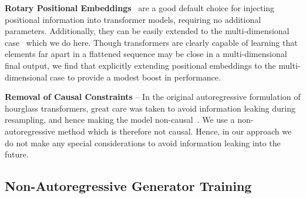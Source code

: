 
\textbf{Rotary Positional Embeddings}~\cite{su2021roformer} are a good default
choice for injecting positional information into transformer models, requiring
no additional parameters. Additionally, they can be easily extended to the
multi-dimensional case~\cite{rope-eleutherai} which we do here. Though
transformers are clearly capable of learning that elements far apart in a
flattened sequence may be close in a multi-dimensional final output, we find
that explicitly extending positional embeddings to the multi-dimensional case to
provide a modest boost in performance.


\textbf{Removal of Causal Constraints} -- In the original autoregressive
formulation of hourglass transformers, great care was taken to avoid information
leaking during resampling, and hence making the model
non-causal~\cite{nawrot2021hierarchical}. We use a non-autoregressive method
which is therefore not causal. Hence, in our approach we do not make any special
considerations to avoid information leaking into the future.

\subsection{Non-Autoregressive Generator Training}


